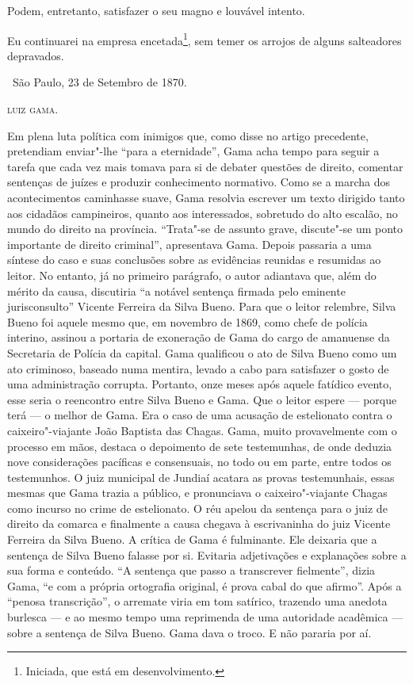 Podem, entretanto, satisfazer o seu magno e louvável intento.

Eu continuarei na empresa encetada\footnote{Iniciada, que está em
  desenvolvimento.}, sem
temer os arrojos de alguns salteadores depravados.

\vfill

\hfill\ São Paulo, 23 de Setembro de 1870.

\hfill\textsc{luiz gama.}

\paginabranca
\mbox{}\vfill
\thispagestyle{empty}

{\small\noindent
Em plena luta política com inimigos que, como disse no artigo
precedente, pretendiam enviar"-lhe ``para a eternidade'', Gama acha tempo
para seguir a tarefa que cada vez mais tomava para si de debater
questões de direito, comentar sentenças de juízes e produzir
conhecimento normativo. Como se a marcha dos acontecimentos caminhasse
suave, Gama resolvia escrever um texto dirigido
tanto aos cidadãos campineiros, quanto aos
interessados, sobretudo do alto escalão, no mundo do direito na
província. ``Trata"-se de assunto grave, discute"-se um ponto importante de
direito criminal'', apresentava Gama. Depois passaria a uma síntese do
caso e suas conclusões sobre as evidências reunidas e resumidas ao
leitor. No entanto, já no primeiro parágrafo, o autor adiantava que,
além do mérito da causa, discutiria ``a notável sentença firmada pelo
eminente jurisconsulto'' Vicente Ferreira da Silva Bueno. Para que o
leitor relembre, Silva Bueno foi aquele mesmo que, em novembro de 1869,
como chefe de polícia interino, assinou a portaria de exoneração de Gama
do cargo de amanuense da Secretaria de Polícia da capital. Gama
qualificou o ato de Silva Bueno como um ato criminoso, baseado numa
mentira, levado a cabo para satisfazer o gosto de uma administração
corrupta. Portanto, onze meses após aquele fatídico evento, esse seria o
reencontro entre Silva Bueno e Gama. Que o leitor espere --- porque terá
--- o melhor de Gama. Era o caso de uma acusação de estelionato contra o
caixeiro"-viajante João Baptista das Chagas. Gama, muito provavelmente
com o processo em mãos, destaca o depoimento de sete testemunhas, de
onde deduzia nove considerações
pacíficas e consensuais, no todo ou em parte, entre todos os
testemunhos. O juiz municipal de Jundiaí acatara as
provas testemunhais, essas mesmas que Gama trazia a público, e
pronunciava o caixeiro"-viajante Chagas como incurso no crime de
estelionato. O réu apelou da sentença para o juiz de direito da comarca
e finalmente a causa chegava à escrivaninha do juiz Vicente Ferreira da
Silva Bueno. A crítica de Gama é fulminante. Ele deixaria que a sentença
de Silva Bueno falasse por si. Evitaria adjetivações e explanações sobre
a sua forma e conteúdo. ``A sentença que passo a transcrever fielmente'',
dizia Gama, ``e com a própria ortografia original, é prova cabal do que
afirmo''. Após a ``penosa transcrição'', o arremate viria em tom satírico,
trazendo uma anedota burlesca --- e ao mesmo tempo uma reprimenda de uma
autoridade acadêmica --- sobre a sentença de Silva Bueno. Gama dava o
troco. E não pararia por aí. }
\thispagestyle{empty}

